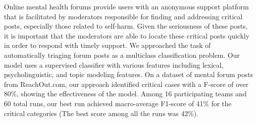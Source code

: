 Online mental health forums provide users with an anonymous support platform that is facilitated by moderators responsible for finding and addressing critical posts, especially those related to self-harm. Given the seriousness of these posts, it is important that the moderators are able to locate these critical posts quickly in order to respond with timely support. We approached the task of automatically triaging forum posts as a multiclass classification problem. Our model uses a supervised classifier with various features including lexical, psycholinguistic, and topic modeling features. On a dataset of mental forum posts from ReachOut.com, our approach identified critical cases with a F-score of over 80\%, showing the effectiveness of the model. Among 16 participating teams and 60 total runs, our best run achieved macro-average F1-score of 41\% for the critical categories (The best score among all the runs was 42\%).
